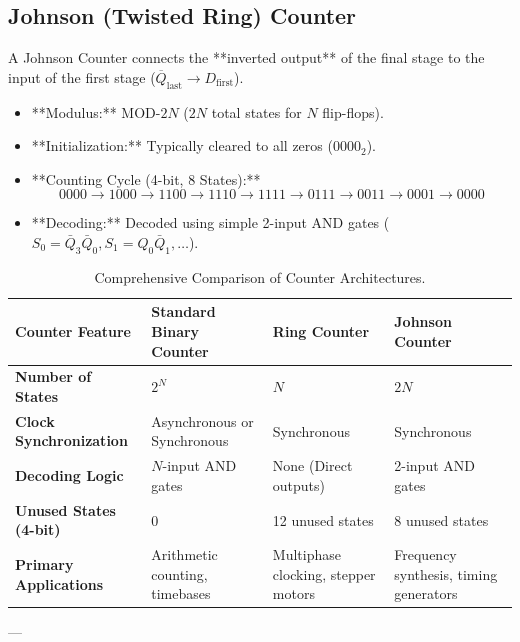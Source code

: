 \subsection{Johnson (Twisted Ring) Counter}
A Johnson Counter connects the **inverted output** of the final stage to the input of the first stage ($\overline{Q}_{\text{last}} \rightarrow D_{\text{first}}$).
\begin{itemize}
    \item **Modulus:** $\text{MOD-}2N$ ($2N$ total states for $N$ flip-flops).
    \item **Initialization:** Typically cleared to all zeros ($0000_2$).
    \item **Counting Cycle (4-bit, 8 States):**
    \begin{equation}
        0000 \rightarrow 1000 \rightarrow 1100 \rightarrow 1110 \rightarrow 1111 \rightarrow 0111 \rightarrow 0011 \rightarrow 0001 \rightarrow 0000
    \end{equation}
    \item **Decoding:** Decoded using simple 2-input AND gates ($S_0 = \bar{Q}_3\bar{Q}_0, S_1 = Q_0\bar{Q}_1, \dots$).
\end{itemize}

\begin{table}[htbp]
\centering
\small
\begin{tabularx}{\textwidth}{lXXX}
\toprule
\textbf{Counter Feature} & \textbf{Standard Binary Counter} & \textbf{Ring Counter} & \textbf{Johnson Counter} \\
\midrule
\textbf{Number of States} & $2^N$ & $N$ & $2N$ \\
\textbf{Clock Synchronization} & Asynchronous or Synchronous & Synchronous & Synchronous \\
\textbf{Decoding Logic} & $N$-input AND gates & None (Direct outputs) & 2-input AND gates \\
\textbf{Unused States (4-bit)} & 0 & 12 unused states & 8 unused states \\
\textbf{Primary Applications} & Arithmetic counting, timebases & Multiphase clocking, stepper motors & Frequency synthesis, timing generators \\
\bottomrule
\end{tabularx}
\caption{Comprehensive Comparison of Counter Architectures.}
\label{tab:counter-comparison}
\end{table}

---

